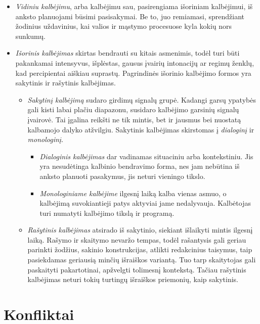 \begin{itemize}
  \item \emph{Vidiniu kalbėjimu}, arba kalbėjimu sau, pasirengiama 
    išoriniam kalbėjimui, iš anksto planuojami būsimi pasisakymai. Be to, 
    juo remiamasi, sprendžiant žodinius uždavinius, kai valios ir mąstymo 
    procesuose kyla kokių nors sunkumų.
  \item \emph{Išorinis kalbėjimas} skirtas bendrauti su kitais asmenimis,
    todėl turi būti pakankamai intensyvus, išplėstas, gausus įvairių 
    intonacijų ar regimų ženklų, kad percipientai aiškiau suprastų.  
    Pagrindinės išorinio kalbėjimo formos yra sakytinis ir rašytinis 
    kalbėjimas.
    \begin{itemize}
      \item \emph{Sakytinį kalbėjimą} sudaro girdimų signalų grupė. Kadangi 
        garsų ypatybės gali kisti labai plačiu diapazonu, susidaro 
        kalbėjimo garsinių signalų įvairovė. Tai įgalina reikšti ne tik 
        mintis, bet ir jausmus bei nuostatą kalbamojo dalyko atžvilgiu. 
        Sakytinis kalbėjimas skirstomas į \emph{dialoginį} ir 
        \emph{monologinį}.
        \begin{itemize}
          \item \emph{Dialoginis kalbėjimas} dar vadinamas situaciniu arba 
            kontekstiniu. Jis yra nesudėtinga kalbinio bendravimo forma, 
            nes jam nebūtina iš anksto planuoti pasakymus, jis neturi 
            vieningo tikslo.
          \item \emph{Monologiniame kalbėjime} ilgesnį laiką kalba vienas 
            asmuo, o kalbėjimą suvokiantieji patys aktyviai jame 
            nedalyvauja.  Kalbėtojas turi numatyti kalbėjimo tikslą ir 
            programą. 
        \end{itemize}
      \item \emph{Rašytinis kalbėjimas} atsirado iš sakytinio, siekiant 
        išlaikyti mintis ilgesnį laiką. Rašymo ir skaitymo nevaržo tempas, 
        todėl rašantysis gali geriau parinkti žodžius, sakinio 
        konstrukcijas, atlikti redakcinius taisymus, taip pasiekdamas 
        geriausią minčių išraiškos variantą. Tuo tarp skaitytojas gali 
        paskaityti pakartotinai, apžvelgti tolimesnį kontekstą. Tačiau 
        rašytinis kalbėjimas neturi tokių turtingų išraiškos priemonių, 
        kaip sakytinis.
    \end{itemize}
\end{itemize}
\section{Konfliktai}

